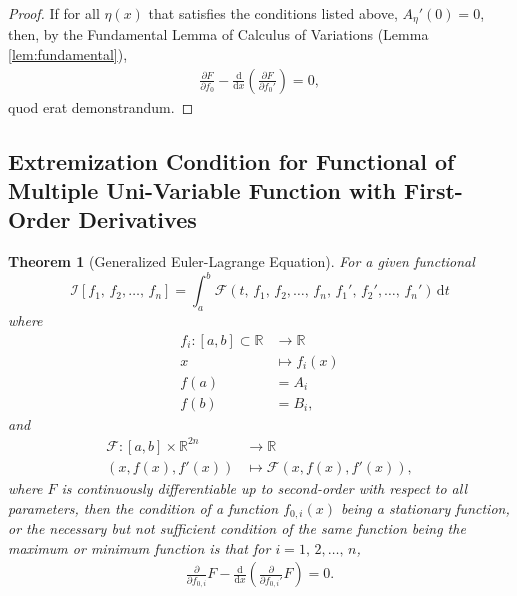 \documentclass[12pt,a4paper]{article}
\newtheorem{theorem}{Theorem}
\begin{document}
\begin{proof}
If for all $\eta(x)$ that satisfies the conditions listed above, ${A_\eta}'(0)=0$, then, by the Fundamental Lemma of Calculus of Variations (Lemma \ref{lem:fundamental}),
\begin{gather}
\frac{\partial F}{\partial f_0}-\frac{\mathrm{d}}{\mathrm{d}x}\left(\frac{\partial F}{\partial {f_0}'}\right)=0,
\end{gather}
quod erat demonstrandum.
\end{proof}

\subsection{Extremization Condition for Functional of Multiple Uni-Variable Function with First-Order Derivatives}
\begin{theorem}[Generalized Euler-Lagrange Equation]
\label{thm:euler_lagrange_generalized}
For a given functional
\[
\mathcal{I}[f_1,\,f_2,\dots,\,f_n]=\int_{a}^{b}\mathcal{F}(t,\,f_1,\,f_2,\dots,\,f_n,\,{f_1}',\,{f_2}',\dots,\,{f_n}')\,\mathrm{d}t
\]
where
\begin{align*}
f_i:[a,b]\subset\mathbb{R}&\to\mathbb{R}\\
x&\mapsto f_i(x)\\
f(a)&=A_i\\
f(b)&=B_i,
\end{align*}
and
\begin{align*}
\mathcal{F}:[a,b]\times\mathbb{R}^{2n}&\to\mathbb{R}\\
(x,f(x),f'(x))&\mapsto\mathcal{F}(x,f(x),f'(x)),
\end{align*}
where $F$ is continuously differentiable up to second-order with respect to all parameters, then the condition of a function $f_{0,i}(x)$ being a stationary function, or the necessary but not sufficient condition of the same function being the maximum or minimum function is that for $i=1,\,2,\dots,\,n$,
\begin{gather}
\label{eqn:euler_lagrange_generalized}
\frac{\partial}{\partial f_{0,i}}F-\frac{\mathrm{d}}{\mathrm{d}x}\left(\frac{\partial}{\partial {f_{0,i}}'}F\right)=0.
\end{gather}
\end{theorem}
\end{document}
